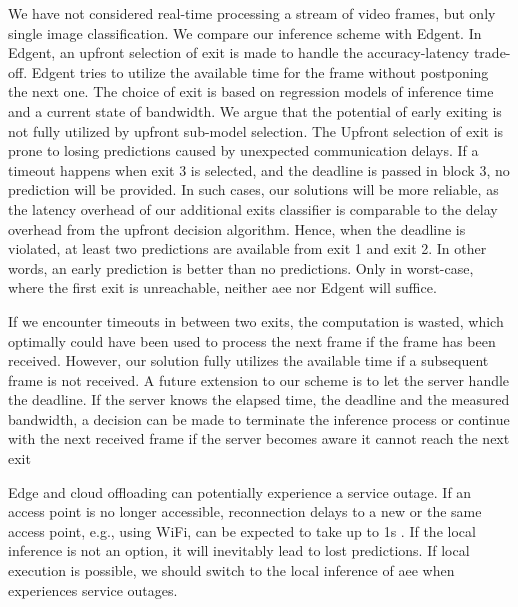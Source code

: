 We have not considered real-time processing a stream of video frames, but only single image classification. We compare our inference scheme with Edgent. In Edgent, an upfront selection of exit is made to handle the accuracy-latency trade-off. Edgent tries to utilize the available time for the frame without postponing the next one. The choice of exit is based on regression models of inference time and a current state of bandwidth.  We argue that the potential of early exiting is not fully utilized by upfront sub-model selection. The Upfront selection of exit is prone to losing predictions caused by unexpected communication delays. If a timeout happens when exit 3 is selected, and the deadline is passed in block 3, no prediction will be provided.  In such cases, our solutions will be more reliable, as the latency overhead of our additional exits classifier is comparable to the delay overhead from the upfront decision algorithm. Hence, when the deadline is violated, at least two predictions are available from exit 1 and exit 2. In other words, an early prediction is better than no predictions. Only in worst-case, where the first exit is unreachable, neither \gls{aee} nor Edgent will suffice. 

If we encounter timeouts in between two exits, the computation is wasted, which optimally could have been used to process the next frame if the frame has been received. However, our solution fully utilizes the available time if a subsequent frame is not received. A future extension to our scheme is to let the server handle the deadline. If the server knows the elapsed time, the deadline and the measured bandwidth, a decision can be made to terminate the inference process or continue with the next received frame if the server becomes aware it cannot reach the next exit  

Edge and cloud offloading can potentially experience a service outage. If an access point is no longer accessible, reconnection delays to a new or the same access point, e.g., using WiFi, can be expected to take up to 1s \cite{pei_why_2017}. If the local inference is not an option, it will inevitably lead to lost predictions. If local execution is possible, we should switch to the local inference of \gls{aee} when experiences service outages. 
